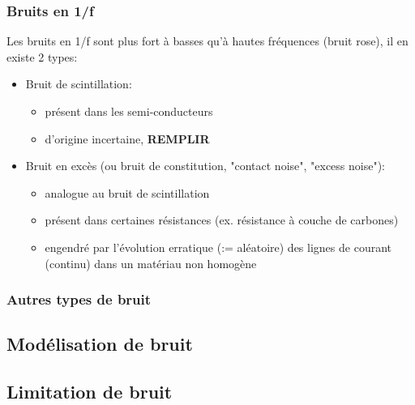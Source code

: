 \subsubsection{Bruits en 1/f}
Les bruits en 1/f sont plus fort à basses qu'à hautes fréquences (bruit rose), il en existe 2 types:
\begin{itemize}
	\item Bruit de scintillation:
	\begin{itemize}
		\item présent dans les semi-conducteurs
		\item d'origine incertaine, \textbf{REMPLIR}
	\end{itemize}
	\item Bruit en excès (ou bruit de constitution, "contact noise", "excess noise"):
	\begin{itemize}
		\item analogue au bruit de scintillation
		\item présent dans certaines résistances (ex. résistance à couche de carbones)
		\item engendré par l'évolution erratique (:= aléatoire) des lignes de courant (continu) dans un matériau non homogène
	\end{itemize}
\end{itemize}
\subsubsection{Autres types de bruit}

\subsection{Modélisation de bruit}

\subsection{Limitation de bruit}